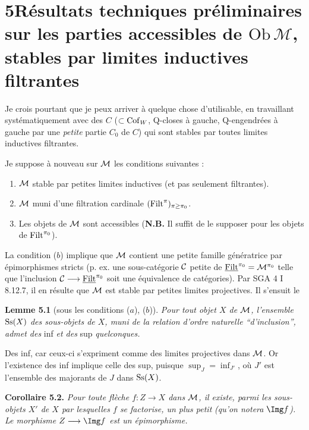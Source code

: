 \section*{5\quad Résultats techniques préliminaires sur les parties accessibles de $\mathrm{Ob}\,\mathcal{M}$, stables par limites inductives filtrantes}

Je crois pourtant que je peux arriver à quelque chose d'utilisable, en travaillant systématiquement avec des $C$ ($\subset\mathrm{Cof}_W$, Q-closes à gauche, Q-engendrées à gauche par une \textit{petite} partie $C_0$ de $C$) qui sont stables par toutes limites inductives filtrantes.


Je suppose à nouveau sur $\mathcal{M}$ les conditions suivantes :

\begin{enumerate}[nosep]
\item[\textit{a})] $\mathcal{M}$ stable par petites limites inductives (et pas seulement filtrantes).
\item[\textit{b})] $\mathcal{M}$ muni d'une filtration cardinale $(\mathrm{Filt}^{\pi})_{\pi\geq\pi_0}$.
\item[\textit{c})] Les objets de $\mathcal{M}$ sont accessibles (\textbf{N.B.} Il suffit de le supposer pour les objets de $\mathrm{Filt}^{\pi_0}$).
\end{enumerate}

La condition ($b$) implique que $\mathcal{M}$ contient une petite famille génératrice par épimorphismes stricts (p. ex. une sous-catégorie $\mathcal{C}$ petite de $\underline{\mathrm{Filt}}^{\pi_0} = \mathcal{M}^{\pi_0}$ telle que l'inclusion $\mathcal{C} \longrightarrow \underline{\mathrm{Filt}}^{\pi_0}$ soit une équivalence de catégories). Par SGA 4 I 8.12.7, il en résulte que $\mathcal{M}$ est stable par petites limites projectives. Il s'ensuit le

\textbf{Lemme 5.1} (sous les conditions ($a$), ($b$)). \textit{Pour tout objet $X$ de $\mathcal{M}$, l'ensemble} $\mathrm{Ss}(X)$ \textit{des sous-objets de $X$, muni de la relation d'ordre naturelle ``d'inclusion'', admet des} inf \textit{et des} sup \textit{quelconques.}

Des inf, car ceux-ci s'expriment comme des limites projectives dans $\mathcal{M}$. Or l'existence des inf implique celle des sup, puisque $\sup_J = \inf_{J'}$, où $J'$ est l'ensemble des majorants de $J$ dans $\mathrm{Ss}(X)$.

\textbf{Corollaire 5.2.} \textit{Pour toute flèche $f : Z \longrightarrow X$ dans $\mathcal{M}$, il existe, parmi les sous-objets $X'$ de $X$ par lesquelles $f$ se factorise, un plus petit} %
\textit{(qu'on notera} $\Img f$\textit{). Le morphisme $Z \longrightarrow \Img f$ est un épimorphisme.}

